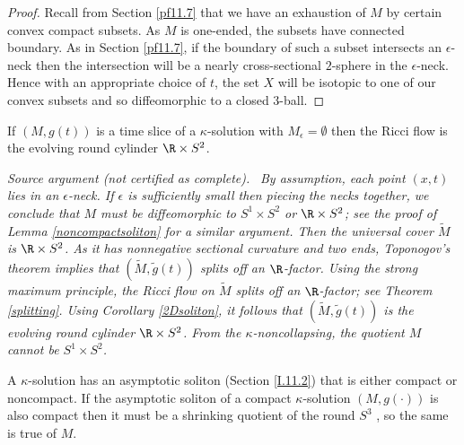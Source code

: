 \begin{proof}
Recall from Section \ref{pf11.7} that we have an exhaustion of
$M$ by certain convex compact subsets.  As $M$ is one-ended, the
subsets have connected boundary.
As in Section \ref{pf11.7}, if the boundary of such a subset intersects an
$\epsilon$-neck then the intersection will be a nearly
cross-sectional $2$-sphere in the $\epsilon$-neck. Hence with
an appropriate choice of $t$, the set $X$ will be isotopic to one
of our convex subsets and so diffeomorphic to a closed $3$-ball.
\end{proof}

\begin{lemma}
  \label{lem:kl-three-dimensional-solutions-kappa-solutions-lemma}
 \label{onlyneck}
If $(M, g(t))$ is a time slice of a $\kappa$-solution with
$M_\epsilon = \emptyset$ then the
Ricci flow is the evolving round cylinder $\R \times S^2$.
\end{lemma}
\par\medskip\noindent\textit{Source argument (not certified as complete).}\ \begingroup\itshape
By assumption, each point $(x,t)$ lies in an $\epsilon$-neck.
If $\epsilon$ is sufficiently small then piecing
the necks together, we conclude that $M$ must be diffeomorphic to
$S^1 \times S^2$ or $\R \times S^2$; see the proof of
Lemma \ref{noncompactsoliton} for a similar argument. Then the universal cover
$\widetilde{M}$ is
$\R \times S^2$. As it has nonnegative sectional curvature and
two ends, Toponogov's theorem implies that $(\widetilde{M},
\widetilde{g}(t))$ splits off
an $\R$-factor. Using the strong maximum principle, the Ricci flow
on $\widetilde{M}$
splits off an $\R$-factor; see Theorem \ref{splitting}.
Using Corollary \ref{2Dsoliton}, it follows that $(\widetilde{M},
\widetilde{g}(t))$ is the evolving round cylinder $\R \times S^2$.
From the $\kappa$-noncollapsing, the quotient $M$ cannot be
$S^1 \times S^2$.
\endgroup\par\medskip

A $\kappa$-solution has an asymptotic soliton
(Section \ref{I.11.2}) that is either compact or noncompact.
If the asymptotic soliton of a compact $\kappa$-solution
$(M, g(\cdot))$ is also compact then it must be a shrinking
quotient of the round $S^3$ \cite{Hamiltonnnnn}, so the same is true of
$M$.

